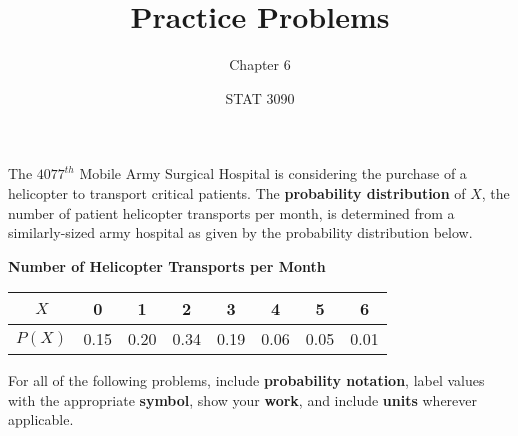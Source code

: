 \documentclass[noanswers]{exam}
\title{Practice Problems}
\author{Chapter 6}
\date{STAT 3090}
\begin{document}
%
%
%

\noindent The $4077^{th}$ Mobile Army Surgical Hospital is considering the purchase of a helicopter to transport critical patients. The \textbf{probability distribution} of $X$, the number of patient helicopter transports per month, is determined from a similarly-sized army hospital as given by the probability distribution below.

\begin{center}
    \textbf{Number of Helicopter Transports per Month}
    
    \vspace{1mm}
    
    \begin{tabular}{| c | c | c | c | c | c | c | c |}
        \hline
        $X$ & 0 & 1 & 2 & 3 & 4 & 5 & 6 \\
         \hline
        $P(X)$ & 0.15 & 0.20 & 0.34 & 0.19 & 0.06 & 0.05 & 0.01 \\
         \hline
    \end{tabular}
	\end{center}
\vspace{3mm}

\noindent For all of the following problems, include \textbf{probability notation}, label values with the appropriate \textbf{symbol}, show your \textbf{work}, and include \textbf{units} wherever applicable.

\vspace{3mm}
\end{document}
